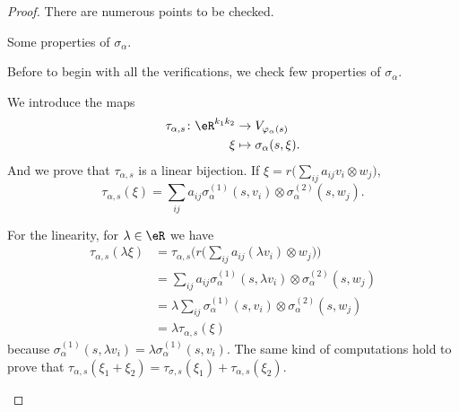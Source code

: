 \begin{proof}
	There are numerous points to be checked.

	\begin{proofpart}
		Some properties of \( \sigma_{\alpha}\).
	\end{proofpart}
	Before to begin with all the verifications, we check few properties of \( \sigma_{\alpha}\).

	We introduce the maps
	\begin{equation}		\label{EQooYICAooRDhYnz}
		\begin{aligned}
			\tau_{\alpha,s}\colon \eR^{k_1k_2} & \to V_{\varphi_{\alpha}(s)}     \\
			\xi                                & \mapsto \sigma_{\alpha}(s,\xi).
		\end{aligned}
	\end{equation}
	And we prove that \( \tau_{\alpha,s}\) is a linear bijection. If \( \xi=r\big( \sum_{ij}a_{ij}v_i\otimes w_j \big)\),
	\begin{equation}
		\tau_{\alpha,s}(\xi)=\sum_{ij}a_{ij}\sigma_{\alpha}^{(1)}(s,v_i)\otimes \sigma_{\alpha}^{(2)}(s,w_j).
	\end{equation}
	\begin{subproof}
				\label{ITEMooCMQEooReGOdu}
		For the linearity, for \( \lambda\in \eR\) we have
		\begin{subequations}
			\begin{align}
				\tau_{\alpha,s}(\lambda\xi) & =\tau_{\alpha,s}\Big( r\big( \sum_{ij}a_{ij}(\lambda v_i)\otimes w_j \big) \Big)         \\
				                            & =\sum_{ij}a_{ij}\sigma_{\alpha}^{(1)}(s,\lambda v_i)\otimes \sigma_{\alpha}^{(2)}(s,w_j) \\
				                            & =\lambda\sum_{ij}\sigma_{\alpha}^{(1)}(s,v_i)\otimes \sigma_{\alpha}^{(2)}(s,w_j)        \\
				                            & =\lambda\tau_{\alpha,s}(\xi)
			\end{align}
		\end{subequations}
		because \( \sigma_{\alpha}^{(1)}(s,\lambda v_i)=\lambda\sigma_{\alpha}^{(1)}(s,v_i)\). The same kind of computations hold to prove that \( \tau_{\alpha,s}(\xi_1+\xi_2)=\tau_{\sigma,s}(\xi_1)+\tau_{\alpha,s}(\xi_2)\).

\end{subproof}
\end{proof}
